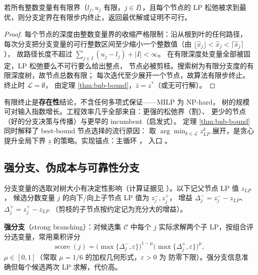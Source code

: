 \begin{theorem}
\label{thm:bnb-termination}
若所有整数变量有有限界（$l_j, u_j$ 有限，$j \in I$），且每个节点的 LP
松弛被求到最优，则分支定界在有限步内终止，返回最优解或证明不可行。
\end{theorem}
\begin{proof}
每个节点的深度由整数变量界的收缩严格限制：沿从根到叶的任何路径，
每次分支把分支变量的可行整数区间至少缩小一个整数值（由
$\lfloor\hat x_j\rfloor < \hat x_j < \lceil\hat x_j\rceil$），
故路径长度不超过 $\sum_{j \in I}(u_j - l_j) + |I| < \infty$。
在有限深度处变量全部被固定，LP 松弛要么不可行要么给出整点，
节点必被剪枝。搜索树为有限分支度的有限深度树，故节点总数有限；
每次迭代至少展开一个节点，故算法有限步终止。终止时 $\mathcal{L} = \emptyset$，
由定理 \ref{thm:bnb-bound}，$\bar z = z^*$（或无可行解）。
\end{proof}

\begin{remark}
有限终止是\textbf{存在性}结论，不含任何多项式保证——MILP 为 NP-hard，
树的规模可对输入指数增长。工程效率几乎全部来自：更强的松弛界（割）、
更少的节点（好的分支决策与传播）与更早的 incumbent（启发式）。
定理 \ref{thm:bnb-bound} 同时解释了 best-bound 节点选择的流行原因：
取 $\arg\min_{k \in \mathcal{L}} z_{LP}^k$ 展开，是贪心提升全局下界
$\underline z$ 的策略。实现锚点：主循环
，
入口 。
\end{remark}

\subsection{强分支、伪成本与可靠性分支}
\label{subsec:branching}

分支变量的选取对树大小有决定性影响（计算证据见
\cite{linderoth1999,achterberg2005}）。以下记父节点 LP 值 $z_{LP}$，
候选分数变量 $j$ 的向下/向上子节点 LP 值为 $z_j^-, z_j^+$，
增益 $\Delta_j^- = z_j^- - z_{LP}$、$\Delta_j^+ = z_j^+ - z_{LP}$
（剪枝的子节点按约定记为充分大的增益）。

\begin{definition}[强分支]
\label{def:strong-branching}
\textbf{强分支}（strong branching）：对候选集 $\mathcal{C}$ 中每个 $j$
实际求解两个子 LP，按组合评分选变量，常用乘积评分
\begin{equation}
\label{eq:product-score}
\operatorname{score}(j) =
\big(\max\{\Delta_j^-, \varepsilon\}\big)^{1-\mu}
\big(\max\{\Delta_j^+, \varepsilon\}\big)^{\mu},
\end{equation}
$\mu \in [0,1]$（常取 $\mu = 1/6$ 的加权几何形式，$\varepsilon > 0$ 为
防零下限）。强分支信息准确但每个候选两次 LP 求解，代价高。
\end{definition}

